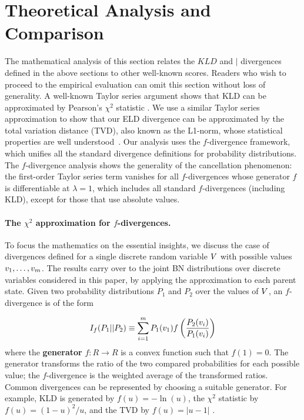 {\section{Theoretical Analysis and Comparison}
The mathematical analysis of this section relates the $KLD$ and $\mid$ divergences defined in the above sections to other well-known scores. Readers who wish to proceed to the empirical evaluation can omit this section without loss of generality. A well-known Taylor series argument shows that KLD can be approximated by Pearson's $\chi^{2}$ statistic \citep{Nielsen2014}. We use a similar Taylor series approximation to show that our ELD divergence can be approximated by the total variation distance (TVD), also known as the L1-norm, whose statistical properties are well understood~\citep{Beirlant2001,Beirlant1994}. 
Our analysis uses the $f$-divergence framework, which unifies all the standard divergence definitions for probability distributions. The $f$-divergence analysis shows the generality of the cancellation phenomenon: the first-order Taylor series term vanishes for all $f$-divergences whose generator $f$ is differentiable at $\lambda = 1$, which includes all standard $f$-divergences (including KLD), except for those that use absolute values. 

\paragraph{The $\chi^2$ approximation for $f$-divergences.}
To focus the mathematics on the essential insights, we discuss the case of divergences defined for a single discrete random variable $V$ with possible values $v_{1},\ldots,v_{m}$. The results carry over to the joint BN distributions over discrete variables considered in this paper, by applying the approximation to each parent state. Given two probability distributions $P_{1}$ and $P_{2}$ over the values of $V$, an $f$-divergence is of the form 

\begin{equation}
\label{eq:f-divergence}
I_{f}(P_{1}||P_{2}) \equiv \sum_{i=1}^{m} P_{1}(v_{1}) f\left(\frac{P_{2}(v_{i})}{P_{1}(v_{i})}\right)
\end{equation}
%
where the \textbf{generator} $f:R \rightarrow R$ is a convex function such that $f(1)=0$. 
The generator transforms the ratio of the two compared probabilities for each possible value; the $f$-divergence is the weighted average of the transformed ratios. Common divergences can be represented by choosing a suitable generator. For example, KLD is generated by $f(u) = -\ln(u)$, the $\chi^{2}$ statistic by $f(u) = (1-u)^{2}/u$, and the TVD by $f(u) = |u-1|$ \citep{Nielsen2014}. 

}
